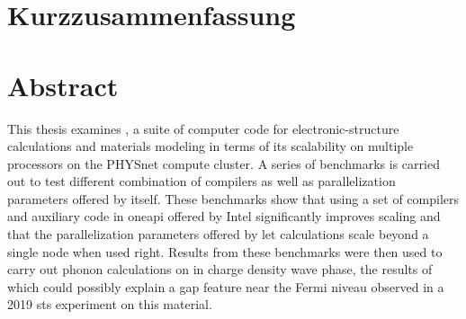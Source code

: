 \documentclass[main.tex]{subfiles}
\begin{document}
\section*{Kurzzusammenfassung}

\section*{Abstract}

This thesis examines \QE, a suite of computer code for electronic-structure calculations and materials modeling in terms of its scalability on multiple processors on the PHYSnet compute cluster.
A series of benchmarks is carried out to test different combination of compilers as well as parallelization parameters offered by \QE itself.
These benchmarks show that using a set of compilers and auxiliary code in \gls{oneapi} offered by Intel significantly improves scaling and that the parallelization parameters offered by \QE let calculations scale beyond a single node when used right.
Results from these benchmarks were then used to carry out phonon calculations on \TaS in charge density wave phase, the results of which could possibly explain a gap feature near the Fermi niveau observed in a 2019 \gls{sts} experiment on this material.
\end{document}
